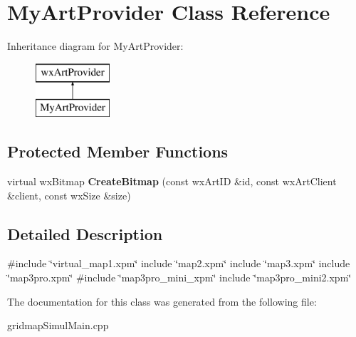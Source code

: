 \hypertarget{classMyArtProvider}{}\section{My\+Art\+Provider Class Reference}
\label{classMyArtProvider}
Inheritance diagram for My\+Art\+Provider\+:\begin{figure}[H]
\begin{center}
\leavevmode
\includegraphics[height=2.000000cm]{classMyArtProvider}
\end{center}
\end{figure}
\subsection*{Protected Member Functions}
\begin{DoxyCompactItemize}
\item 
\mbox{\label{classMyArtProvider_a4f06bcde38b57c560d5d9ec79ebd35dc}} 
virtual wx\+Bitmap {\bfseries Create\+Bitmap} (const wx\+Art\+ID \&id, const wx\+Art\+Client \&client, const wx\+Size \&size)
\end{DoxyCompactItemize}


\subsection{Detailed Description}
\#include \char`\"{}virtual\+\_\+map1.\+xpm\char`\"{} include \char`\"{}map2.\+xpm\char`\"{} include \char`\"{}map3.\+xpm\char`\"{} include \char`\"{}map3pro.\+xpm\char`\"{} \#include \char`\"{}map3pro\+\_\+mini\+\_\+xpm\char`\"{} include \char`\"{}map3pro\+\_\+mini2.\+xpm\char`\"{} 

The documentation for this class was generated from the following file\+:\begin{DoxyCompactItemize}
\item 
gridmap\+Simul\+Main.\+cpp\end{DoxyCompactItemize}

